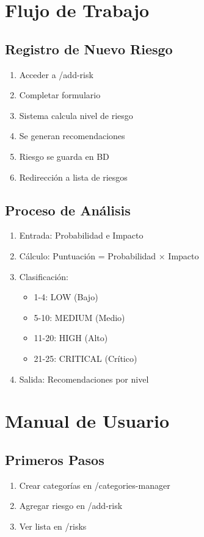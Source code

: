 \documentclass[12pt, a4paper, oneside]{article}
\begin{document}
\section{Flujo de Trabajo}

\subsection{Registro de Nuevo Riesgo}
\begin{enumerate}
    \item Acceder a /add-risk
    \item Completar formulario
    \item Sistema calcula nivel de riesgo
    \item Se generan recomendaciones
    \item Riesgo se guarda en BD
    \item Redirección a lista de riesgos
\end{enumerate}

\subsection{Proceso de Análisis}
\begin{enumerate}
    \item Entrada: Probabilidad e Impacto
    \item Cálculo: Puntuación = Probabilidad × Impacto
    \item Clasificación:
    \begin{itemize}
        \item 1-4: LOW (Bajo)
        \item 5-10: MEDIUM (Medio)
        \item 11-20: HIGH (Alto)
        \item 21-25: CRITICAL (Crítico)
    \end{itemize}
    \item Salida: Recomendaciones por nivel
\end{enumerate}

\section{Manual de Usuario}

\subsection{Primeros Pasos}
\begin{enumerate}
    \item Crear categorías en /categories-manager
    \item Agregar riesgo en /add-risk
    \item Ver lista en /risks
\end{enumerate}
\end{document}
